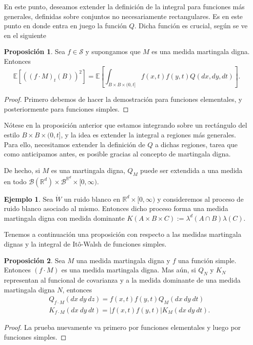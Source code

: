 \documentclass[letterpaper,twoside,12pt]{book}
\newcommand{\R}{\mathbb{R}}
\newcommand{\B}{\mathcal{B}}
\newcommand{\E}{\mathbb{E}}
\newcommand{\W}{\dot{W}}
\newcommand{\1}{\mathds{1}}
\newcommand{\abs}[1]{\left\lvert #1 \right\rvert}
\theoremstyle{definition}
\theoremstyle{definition}
\theoremstyle{definition}
\theoremstyle{definition}
\newtheorem{prop}{Proposición}
\theoremstyle{definition}
\theoremstyle{definition}
\newtheorem{ejem}{Ejemplo}
\theoremstyle{definition}
\begin{document}
En este punto, deseamos extender la definición de la integral para funciones más generales, definidas sobre conjuntos no necesariamente rectangulares. Es en este punto en donde entra en juego la función $Q$.  Dicha función es crucial, según se ve en el siguiente 

\begin{prop} 
 Sea $f\in \mathscr{S}$ y supongamos que $M$ es una medida martingala digna. Entonces 
 \[
 \E\left[((f\cdot M)_t(B))^2\right]=\E\left[\int_{B\times B\times (0,t]}f(x,t)f(y,t)Q(dx,dy,dt)\right].   
 \]
 \end{prop}

 \begin{proof} 
    Primero debemos de hacer la demostración para funciones elementales, y posteriormente para funciones simples.
  \end{proof}
Nótese en la proposición anterior que estamos integrando sobre un rectángulo del estilo $B\times B\times (0,t]$, y la idea es extender la integral a regiones más generales. Para ello, necesitamos extender la definición de $Q$ a dichas regiones, tarea que como anticipamos antes, es posible gracias al concepto de martingala digna.

De hecho, si $M$ es una martingala digna, $Q_M$ puede ser extendida a una medida en todo $\B(\R^{d})\times \B^{\R^{d}}\times [0,\infty)$. 

\begin{ejem} 
 Sea $\W$ un ruido blanco en $\R^{d}\times[0,\infty)$ y consideremos al proceso de ruido blanco asociado al mismo. Entonces dicho proceso forma una medida martingala digna con medida dominante $K(A\times B \times C):=\lambda^{d}(A\cap B)\lambda(C)$.
 \end{ejem}

Tenemos a continuación una proposición con respecto a las medidas martingala dignas y la integral de Itô-Walsh de funciones simples.

\begin{prop} 
 Sea $M$ una medida martingala digna y $f$ una función simple. Entonces $(f\cdot M)$ es una medida martingala digna. 
Mas aún, si $Q_N$ y $K_N$ representan al funcional de covarianza y a la medida dominante de una medida martingala digna $N$, entonces 
\begin{align*}
    &Q_{f\cdot M}(dx \ dy \ dz)=f(x,t)f(y,t)Q_M(dx \ dy \ dt)\\
    &K_{f\cdot M}(dx \ dy \ dt)=\abs{f(x,t)f(y,t)}K_M(dx \ dy \ dt). 
\end{align*}
 \end{prop}
 \begin{proof} 
   La prueba nuevamente va primero por funciones elementales y luego por funciones simples. 
  \end{proof}
\end{document}
